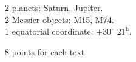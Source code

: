 2 planets: Saturn, Jupiter.\\
2 Messier objects: M15, M74.\\
1 equatorial coordinate: $+30^\circ$ $21^{\mathrm{h}}$.

8 points for each text.
